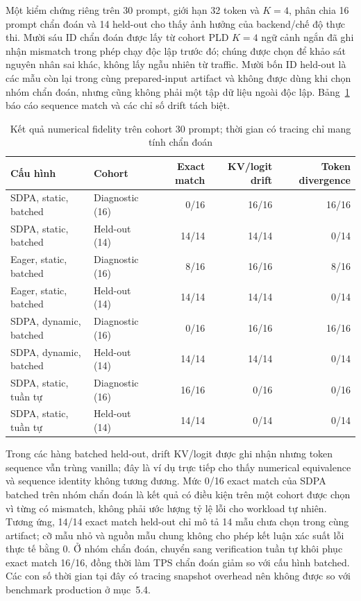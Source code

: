 Một kiểm chứng riêng trên 30 prompt, giới hạn 32 token và \(K=4\), phân chia 16 prompt chẩn đoán và 14 held-out cho thấy ảnh hưởng của backend/chế độ thực thi. Mười sáu ID chẩn đoán được lấy từ cohort PLD \(K=4\) ngữ cảnh ngắn đã ghi nhận mismatch trong phép chạy độc lập trước đó; chúng được chọn để khảo sát nguyên nhân sai khác, không lấy ngẫu nhiên từ traffic. Mười bốn ID held-out là các mẫu còn lại trong cùng prepared-input artifact và không được dùng khi chọn nhóm chẩn đoán, nhưng cũng không phải một tập dữ liệu ngoài độc lập. Bảng~\ref{tab:ch5-fidelity} báo cáo sequence match và các chỉ số drift tách biệt.

\begin{table}[htbp]
\centering
\small
\caption{Kết quả numerical fidelity trên cohort 30 prompt; thời gian có tracing chỉ mang tính chẩn đoán}
\label{tab:ch5-fidelity}
\begin{tabularx}{\textwidth}{@{}Xlrrr@{}}
\toprule
\textbf{Cấu hình} & \textbf{Cohort} & \textbf{Exact match} & \textbf{KV/logit drift} & \textbf{Token divergence} \\
\midrule
SDPA, static, batched & Diagnostic (16) & 0/16 & 16/16 & 16/16 \\
SDPA, static, batched & Held-out (14) & 14/14 & 14/14 & 0/14 \\
Eager, static, batched & Diagnostic (16) & 8/16 & 16/16 & 8/16 \\
Eager, static, batched & Held-out (14) & 14/14 & 14/14 & 0/14 \\
SDPA, dynamic, batched & Diagnostic (16) & 0/16 & 16/16 & 16/16 \\
SDPA, dynamic, batched & Held-out (14) & 14/14 & 14/14 & 0/14 \\
SDPA, static, tuần tự & Diagnostic (16) & 16/16 & 0/16 & 0/16 \\
SDPA, static, tuần tự & Held-out (14) & 14/14 & 0/14 & 0/14 \\
\bottomrule
\end{tabularx}
\end{table}

Trong các hàng batched held-out, drift KV/logit được ghi nhận nhưng token sequence vẫn trùng vanilla; đây là ví dụ trực tiếp cho thấy numerical equivalence và sequence identity không tương đương. Mức 0/16 exact match của SDPA batched trên nhóm chẩn đoán là kết quả có điều kiện trên một cohort được chọn vì từng có mismatch, không phải ước lượng tỷ lệ lỗi cho workload tự nhiên. Tương ứng, 14/14 exact match held-out chỉ mô tả 14 mẫu chưa chọn trong cùng artifact; cỡ mẫu nhỏ và nguồn mẫu chung không cho phép kết luận xác suất lỗi thực tế bằng 0. Ở nhóm chẩn đoán, chuyển sang verification tuần tự khôi phục exact match 16/16, đồng thời làm TPS chẩn đoán giảm so với cấu hình batched. Các con số thời gian tại đây có tracing snapshot overhead nên không được so với benchmark production ở mục~5.4.

